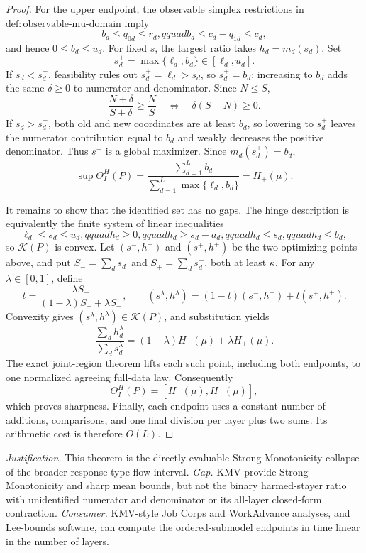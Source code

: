 \documentclass{article}
\begin{document}
\begin{proof}
For the upper endpoint, the observable simplex restrictions in \(\mathrm{def{:}observable\mbox{-}mu\mbox{-}domain}\) imply
\[b_d\le q_{0d}\le r_d,qquad b_d\le c_d-q_{1d}\le c_d,\]
and hence \(0\le b_d\le u_d\).  For fixed \(s\), the largest ratio takes \(h_d=m_d(s_d)\).  Set
\[s_d^+=\max\{\ell_d,b_d\}\in[\ell_d,u_d].\]
If \(s_d<s_d^+\), feasibility rules out \(s_d^+=\ell_d>s_d\), so \(s_d^+=b_d\); increasing to \(b_d\) adds the same \(\delta\ge0\) to numerator and denominator.  Since \(N\le S\),
\[\frac{N+\delta}{S+\delta}\ge\frac NS
\quad\Longleftrightarrow\quad
\delta(S-N)\ge0.\]
If \(s_d>s_d^+\), both old and new coordinates are at least \(b_d\), so lowering to \(s_d^+\) leaves the numerator contribution equal to \(b_d\) and weakly decreases the positive denominator.  Thus \(s^+\) is a global maximizer.  Since \(m_d(s_d^+)=b_d\),
\[\sup\Theta_I^H(P)=
\frac{\sum_{d=1}^{L}b_d}
{\sum_{d=1}^{L}\max\{\ell_d,b_d\}}=H_+(\mu).\]

It remains to show that the identified set has no gaps.  The hinge description is equivalently the finite system of linear inequalities
\[\ell_d\le s_d\le u_d,qquad h_d\ge0,qquad h_d\ge s_d-a_d,qquad
h_d\le s_d,qquad h_d\le b_d,\]
so \(\mathcal K(P)\) is convex.  Let \((s^-,h^-)\) and \((s^+,h^+)\) be the two optimizing points above, and put \(S_-=\sum_ds_d^-\) and \(S_+=\sum_ds_d^+\), both at least \(\kappa\).  For any \(\lambda\in[0,1]\), define
\[t=\frac{\lambda S_-}{(1-\lambda)S_++\lambda S_-},\qquad
(s^{\lambda},h^{\lambda})=(1-t)(s^-,h^-)+t(s^+,h^+).\]
Convexity gives \((s^{\lambda},h^{\lambda})\in\mathcal K(P)\), and substitution yields
\[\frac{\sum_dh_d^{\lambda}}{\sum_ds_d^{\lambda}}
=(1-\lambda)H_-(\mu)+\lambda H_+(\mu).\]
The exact joint-region theorem lifts each such point, including both endpoints, to one normalized agreeing full-data law.  Consequently
\[\Theta_I^H(P)=[H_-(\mu),H_+(\mu)],\]
which proves sharpness.  Finally, each endpoint uses a constant number of additions, comparisons, and one final division per layer plus two sums.  Its arithmetic cost is therefore \(O(L)\).
\end{proof}
\par\smallskip\noindent \textit{Justification.} This theorem is the directly evaluable Strong Monotonicity collapse of the broader response-type flow interval. \textit{Gap.} KMV provide Strong Monotonicity and sharp mean bounds, but not the binary harmed-stayer ratio with unidentified numerator and denominator or its all-layer closed-form contraction. \textit{Consumer.} KMV-style Job Corps and WorkAdvance analyses, and Lee-bounds software, can compute the ordered-submodel endpoints in time linear in the number of layers.
\end{document}
